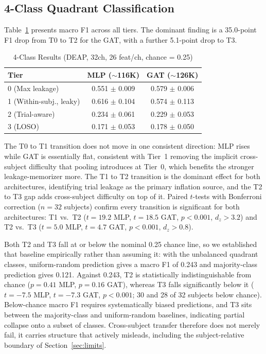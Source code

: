 \documentclass[conference,a4paper]{IEEEtran}
\begin{document}
\subsection{4-Class Quadrant Classification}

Table~\ref{tab:models} presents macro F1 across all tiers. The dominant finding is a 35.0-point F1 drop from T0 to T2 for the GAT, with a further 5.1-point drop to T3.

\begin{table}[t]
\centering
\caption{4-Class Results (DEAP, 32ch, 26 feat/ch, chance = 0.25)}
\label{tab:models}
\begin{tabular}{lcc}
\toprule
Tier & MLP ($\sim$116K) & GAT ($\sim$126K) \\
\midrule
0 (Max leakage) & 0.551 $\pm$ 0.009 & 0.579 $\pm$ 0.006 \\
1 (Within-subj., leaky) & 0.616 $\pm$ 0.104 & 0.574 $\pm$ 0.113 \\
2 (Trial-aware) & 0.234 $\pm$ 0.061 & 0.229 $\pm$ 0.053 \\
3 (LOSO) & 0.171 $\pm$ 0.053 & 0.178 $\pm$ 0.050 \\
\bottomrule
\end{tabular}
\end{table}

The T0 to T1 transition does not move in one consistent direction: MLP rises while GAT is essentially flat, consistent with Tier~1 removing the implicit cross-subject difficulty that pooling introduces at Tier~0, which benefits the stronger leakage-memorizer more. The T1 to T2 transition is the dominant effect for both architectures, identifying trial leakage as the primary inflation source, and the T2 to T3 gap adds cross-subject difficulty on top of it. Paired $t$-tests with Bonferroni correction ($n=32$ subjects) confirm every transition is significant for both architectures: T1 vs.\ T2 ($t=19.2$ MLP, $t=18.5$ GAT, $p<0.001$, $d_z>3.2$) and T2 vs.\ T3 ($t=5.0$ MLP, $t=4.7$ GAT, $p<0.001$, $d_z>0.8$).

Both T2 and T3 fall at or below the nominal 0.25 chance line, so we established that baseline empirically rather than assuming it: with the unbalanced quadrant classes, uniform-random prediction gives a macro F1 of 0.243 and majority-class prediction gives 0.121. Against 0.243, T2 is statistically indistinguishable from chance ($p=0.41$ MLP, $p=0.16$ GAT), whereas T3 falls significantly below it ($t=-7.5$ MLP, $t=-7.3$ GAT, $p<0.001$; 30 and 28 of 32 subjects below chance). Below-chance macro F1 requires systematically biased predictions, and T3 sits between the majority-class and uniform-random baselines, indicating partial collapse onto a subset of classes. Cross-subject transfer therefore does not merely fail, it carries structure that actively misleads, including the subject-relative boundary of Section~\ref{sec:limits}.
\end{document}
